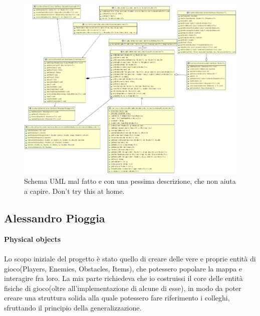 \begin{figure}[h]
	\centering{}
	\includegraphics[width=\textwidth]{img/badarch}
	\caption{Schema UML mal fatto e con una pessima descrizione, che non aiuta a capire. Don't try this at home.}
	\label{img:badarch}
\end{figure}



\newpage

\subsection*{Alessandro Pioggia}
\textbf{Physical objects} \\ \\
Lo scopo iniziale del progetto è stato quello di creare delle vere e proprie entità di gioco(Players, Enemies, Obstacles, Items), che potessero popolare la mappa e interagire fra loro.
La mia parte richiedeva che io costruissi il core delle entità fisiche di gioco(oltre all'implementazione di alcune di esse), in modo da poter creare una struttura solida alla quale potessero fare riferimento i colleghi, sfruttando il principio della generalizzazione.


